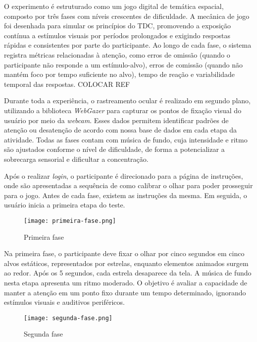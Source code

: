 O experimento é estruturado como um jogo digital de temática espacial, composto por
três fases com níveis crescentes de dificuldade. A mecânica de jogo foi desenhada para simular os
princípios do TDC, promovendo a exposição contínua a estímulos visuais por períodos prolongados e exigindo respostas rápidas e consistentes por parte do participante. Ao longo de cada fase, o sistema registra métricas relacionadas à atenção, como erros de omissão (quando o participante não responde a um estímulo-alvo), erros de comissão (quando não mantém foco por tempo suficiente no alvo), tempo de reação e variabilidade temporal das respostas. COLOCAR REF

Durante toda a experiência, o rastreamento ocular é realizado em segundo plano, utilizando a biblioteca \textit{WebGazer} para capturar os pontos de fixação visual do usuário por meio da \textit{webcam}. Esses dados permitem identificar padrões de atenção ou desatenção de acordo com nossa base de dados em cada etapa da atividade. Todas as fases contam com música de fundo, cuja intensidade e ritmo são ajustados conforme o nível de dificuldade, de forma a potencializar a sobrecarga sensorial e dificultar a concentração.

Após o realizar \textit{login}, o participante é direcionado para a página de instruções, onde são apresentadas a sequência de como calibrar o olhar para poder prosseguir para o jogo. Antes de cada fase, existem as instruções da mesma. Em seguida, o usuário inicia a primeira etapa do teste. 

\begin{figure}[H]
    \centering
    \caption{Primeira fase}%
    \label{fig:primeira-fase}
    \texttt{[image: primeira-fase.png]}%
\end{figure}

Na primeira fase, o participante deve fixar o olhar por cinco segundos em cinco alvos estáticos,
representados por estrelas, enquanto elementos animados surgem ao redor. Após os 5 segundos,
cada estrela desaparece da tela. A música de fundo nesta etapa apresenta um ritmo moderado. O
objetivo é avaliar a capacidade de manter a atenção em um ponto fixo durante um tempo determinado, ignorando estímulos visuais e auditivos periféricos.

\begin{figure}[H]
    \centering
    \caption{Segunda fase}%
    \label{fig:segunda-fase}
    \texttt{[image: segunda-fase.png]}%
\end{figure}

